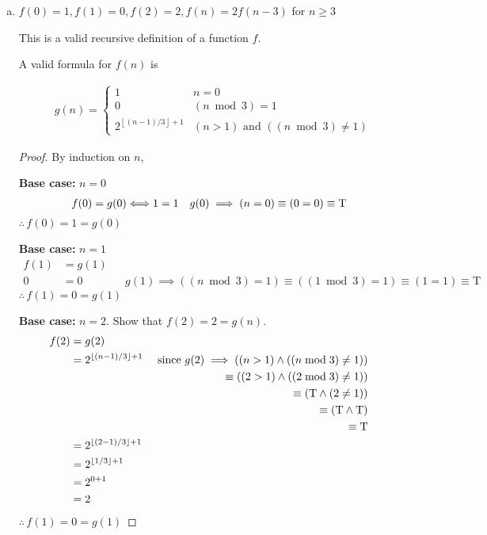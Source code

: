 \documentclass{homework}
\begin{document}
\begin{problem}{2}
\begin{enumerate}[(a)]

\item $f(0) = 1, f(1) = 0, f(2) = 2, f(n) = 2f(n - 3)$ for $n \geq 3$

This is a valid recursive definition of a function $f$.

A valid formula for $f(n)$ is

\begin{align*}
& g(n) =
  \begin{cases}
   1 & n = 0 \\
   0 & (n \bmod 3) = 1 \\
   2^{\left\lfloor (n-1)/3\right\rfloor +1} & (n > 1) \text{ and } ((n \bmod 3) \neq 1)
  \end{cases}
\end{align*}

\begin{proof}
By induction on $n$,

\textbf{Base case:} $n = 0$\\
\begin{align*}
f(0) = g(0) \Longleftrightarrow 1 = 1 && g(0) \implies (n = 0) \equiv (0 = 0) \equiv \text{T}
\end{align*}
$\therefore \, f(0) = 1 = g(0)$

\textbf{Base case:} $n = 1$\\
\begin{align*}
f(1) &= g(1) \\
0 &= 0 && g(1) \implies ((n \bmod 3) = 1) \equiv ((1 \bmod 3) = 1) \equiv (1 = 1) \equiv \text{T}
\end{align*}
$\therefore \, f(1) = 0 = g(1)$

\textbf{Base case:} $n = 2$. Show that $f(2) = 2 = g(n)$.\\
\begin{align*}
f(2) &= g(2) \\
&= 2^{\left\lfloor (n-1)/3\right\rfloor +1} & \text{  since } g(2) \implies ((n > 1) \land ((n \bmod 3) \neq 1)) \\
& & \equiv ((2 > 1) \land ((2 \bmod 3) \neq 1)) \\
& & \equiv (\text{T} \land (2 \neq 1)) \\
& & \equiv (\text{T} \land \text{T}) \\
& & \equiv \text{T} \\
&= 2^{\left\lfloor (2-1)/3\right\rfloor +1} \\
&= 2^{\left\lfloor 1/3\right\rfloor +1} \\
&= 2^{0+1} \\
&= 2
\end{align*}
$\therefore \, f(1) = 0 = g(1)$



\end{proof}
\end{enumerate}
\end{problem}
\end{document}
